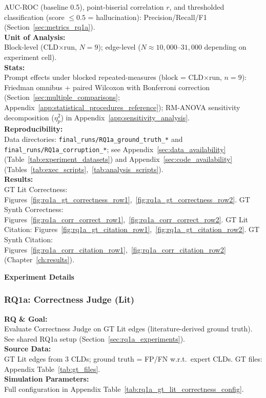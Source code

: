 AUC-ROC (baseline 0.5), point-biserial correlation $r$, and thresholded classification (score $\leq 0.5$ = hallucination): Precision/Recall/F1 (Section~\ref{sec:metrics_rq1a}).\\
\textbf{Unit of Analysis:}\\
Block-level (CLD$\times$run, $N=9$); edge-level ($N \approx 10{,}000$--$31{,}000$ depending on experiment cell).\\
\textbf{Stats:}\\
Prompt effects under blocked repeated-measures (block = CLD$\times$run, $n{=}9$): Friedman omnibus + paired Wilcoxon with Bonferroni correction (Section~\ref{sec:multiple_comparisons}; Appendix~\ref{app:statistical_procedures_reference}); RM-ANOVA sensitivity decomposition ($\eta^2_p$) in Appendix~\ref{app:sensitivity_analysis}.\\
\textbf{Reproducibility:}\\
Data directories: \texttt{final\_runs/RQ1a\_ground\_truth\_*} and \texttt{final\_runs/RQ1a\_corruption\_*}; see Appendix~\ref{sec:data_availability} (Table~\ref{tab:experiment_datasets}) and Appendix~\ref{sec:code_availability} (Tables~\ref{tab:exec_scripts},~\ref{tab:analysis_scripts}).\\
\textbf{Results:}\\
GT Lit Correctness: Figures~\ref{fig:rq1a_gt_correctness_row1},~\ref{fig:rq1a_gt_correctness_row2}. GT Synth Correctness: Figures~\ref{fig:rq1a_corr_correct_row1},~\ref{fig:rq1a_corr_correct_row2}. GT Lit Citation: Figures~\ref{fig:rq1a_gt_citation_row1},~\ref{fig:rq1a_gt_citation_row2}. GT Synth Citation: Figures~\ref{fig:rq1a_corr_citation_row1},~\ref{fig:rq1a_corr_citation_row2} (Chapter~\ref{ch:results}).

\noindent\textbf{Experiment Details}

\subsubsection{RQ1a: Correctness Judge (Lit)}
\label{sec:rq1a_correctness_lit}

\textbf{RQ \& Goal:}\\
Evaluate Correctness Judge on GT Lit edges (literature-derived ground truth). See shared RQ1a setup (Section~\ref{sec:rq1a_experiments}).\\
\textbf{Source Data:}\\
GT Lit edges from 3 CLDs; ground truth = FP/FN w.r.t.\ expert CLDs. GT files: Appendix Table~\ref{tab:gt_files}.\\
\textbf{Simulation Parameters:}\\
Full configuration in Appendix Table~\ref{tab:rq1a_gt_lit_correctness_config}.\\

